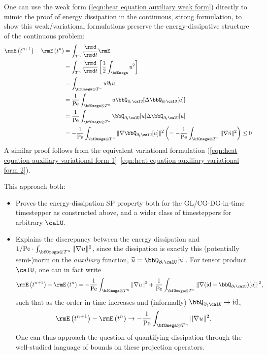     One can use the weak form (\ref{eqn:heat equation auxiliary weak form}) directly to mimic the proof of energy dissipation in the continuous, strong formulation, to show this weak/variational formulations preserve the energy-dissipative structure of the continuous problem:
    \begin{align}
        \rmE\left(t^{n + 1}\right) - \rmE\left(t^{n}\right)  &=  \int_{T^{n}}\frac{\rmd}{\rmd t}\rmE  \\
        &=  \int_{T^{n}}\frac{\rmd}{\rmd t}\left[\frac{1}{2}\int_{\bfOmega}u^{2}\right]  \\
        &=  \int_{\bfOmega\otimes T^{n}}u\partial_{t}u  \\
        &=  \frac{1}{\rmPe}\int_{\bfOmega\otimes T^{n}}u\bbQ_{\partial_{t}\calU}[\Delta\bbQ_{\partial_{t}\calU}[u]]  \\
        &=  \frac{1}{\rmPe}\int_{\bfOmega\otimes T^{n}}\bbQ_{\partial_{t}\calU}[u]\Delta\bbQ_{\partial_{t}\calU}[u]  \\
        &=  - \frac{1}{\rmPe}\int_{\bfOmega\otimes T^{n}}\|\nabla\bbQ_{\partial_{t}\calU}[u]\|^{2}  \left(=  - \frac{1}{\rmPe}\int_{\bfOmega\otimes T^{n}}\|\nabla\widetilde{u}\|^{2}\right)  \leq  0
    \end{align}
    A similar proof follows from the equivalent variational formulation (\ref{eqn:heat equation auxiliary variational form 1}--\ref{eqn:heat equation auxiliary variational form 2}).

    This approach both:
    \begin{itemize}
        \item  Proves the energy-dissipation SP property both for the GL/CG-DG-in-time timestepper as constructed above, and a wider class of timesteppers for arbitrary $\calU$. 
        \item  Explains the discrepancy between the energy dissipation and $1/\rmPe\cdot\int_{\bfOmega\otimes T^{n}}\|\nabla u\|^{2}$, since the dissipation is exactly this (potentially semi-)norm on the \emph{auxiliary} function, $\widetilde{u}  =  \bbQ_{\partial_{t}\calU}[u]$. For tensor product $\calU$, one can in fact write
        \begin{equation}
            \rmE\left(t^{n + 1}\right) - \rmE\left(t^{n}\right)  =  - \frac{1}{\rmPe}\int_{\bfOmega\otimes T^{n}}\|\nabla u\|^{2} + \frac{1}{\rmPe}\int_{\bfOmega\otimes T^{n}}\|\nabla(\id - \bbQ_{\partial_{t}\calU})[u]\|^{2},
        \end{equation}
        such that as the order in time increases and (informally) $\bbQ_{\partial_{t}\calU}  \rightarrow  \id$,
        \begin{equation}
            \rmE\left(t^{n + 1}\right) - \rmE\left(t^{n}\right)  \rightarrow  - \frac{1}{\rmPe}\int_{\bfOmega\otimes T^{n}}\|\nabla u\|^{2}.
        \end{equation}
        One can thus approach the question of quantifying dissipation through the well-studied language of bounds on these projection operators.
    \end{itemize}
    